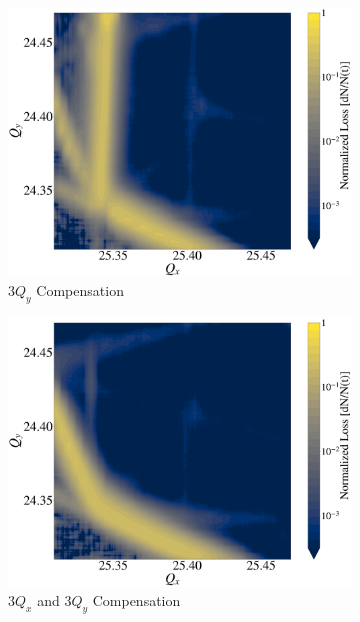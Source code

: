 \begin{figure}[H]
\begin{subfigure}{.49\textwidth}
      \includegraphics[width=0.98\linewidth]{chapter4/3qy.png}
      \caption{$3Q_y$ Compensation}
      \label{fig:sfig3}
    \end{subfigure}
    \hfill
    \begin{subfigure}{.49\textwidth}
      \includegraphics[width=0.98\linewidth]{chapter4/3qx_3qy.png}
      \caption{$3Q_x$ and $3Q_y$ Compensation}
      \label{fig:sfig4}
    \end{subfigure}%
    \hfill
    \begin{subfigure}{.49\textwidth}

\end{subfigure}
\end{figure}
